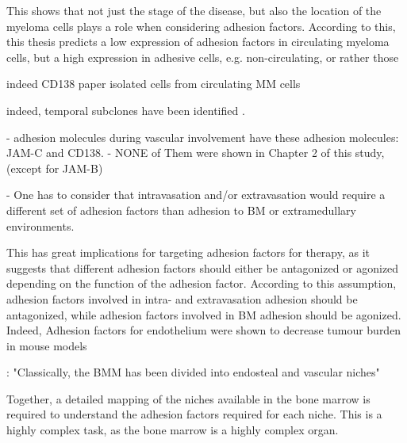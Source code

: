 This shows that not just the stage of the disease, but also the location of the
myeloma cells plays a role when considering adhesion factors. According to this, this thesis
predicts a low expression of adhesion factors in circulating myeloma cells,
but a high expression in adhesive cells, e.g. non-circulating, or rather those

indeed CD138 paper isolated cells from circulating MM cells \cite{akhmetzyanovaDynamicCD138Surface2020}

indeed, temporal subclones have been identified \cite{keatsClonalCompetitionAlternating2012}.

%
\label{sec:discussion_subsets_adhesion_factors}%

- adhesion molecules during vascular involvement have these adhesion molecules: JAM-C
and CD138.
- NONE of Them were shown in Chapter 2 of this study, (except for JAM-B)


- One has to consider that intravasation and/or extravasation would require a different
set of adhesion factors than adhesion to BM or extramedullary environments.

This has great implications for targeting adhesion factors for therapy, as it
suggests that different adhesion factors should either be antagonized or
agonized depending on the function of the adhesion factor. According to this
assumption, adhesion factors involved in intra- and extravasation adhesion should be
antagonized, while adhesion factors involved in BM adhesion  should be agonized. Indeed, Adhesion factors for endothelium
were shown to decrease tumour burden in mouse models \cite{asosinghUniquePathwayHoming2001a,mrozikTherapeuticTargetingNcadherin2015}

\citet{bouzerdanAdhesionMoleculesMultiple2022}: "Classically, the BMM has been
divided into endosteal and vascular niches"

Together, a detailed mapping of the niches available in the bone marrow is required
to understand the adhesion factors required for each niche. This is a highly
complex task, as the bone marrow is a highly complex organ.

%
\label{sec:discussion_many_small_switches}%

